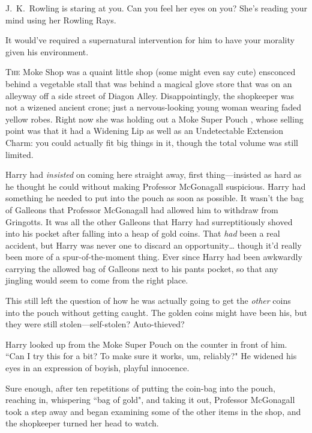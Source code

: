 
\begin{chapterOpeningAuthorNote}
J.~K.~Rowling is staring at you. Can you feel her eyes on you? She's reading your mind using her Rowling Rays.
\end{chapterOpeningAuthorNote}
\begin{chapterOpeningQuote}
It would've required a supernatural intervention for him to have your morality given his environment.
\end{chapterOpeningQuote}

\lettrine{T}{he} Moke Shop was a quaint little shop (some might even say cute) ensconced behind a vegetable stall that was behind a magical glove store that was on an alleyway off a side street of Diagon Alley. Disappointingly, the shopkeeper was not a wizened ancient crone; just a nervous-looking young woman wearing faded yellow robes. Right now she was holding out a Moke Super Pouch , whose selling point was that it had a Widening Lip as well as an Undetectable Extension Charm: you could actually fit big things in it, though the total volume was still limited.

Harry had \emph{insisted} on coming here straight away, first thing---insisted as hard as he thought he could without making Professor McGonagall suspicious. Harry had something he needed to put into the pouch as soon as possible. It wasn't the bag of Galleons that Professor McGonagall had allowed him to withdraw from Gringotts. It was all the other Galleons that Harry had surreptitiously shoved into his pocket after falling into a heap of gold coins. That \emph{had} been a real accident, but Harry was never one to discard an opportunity{\ldots} though it'd really been more of a spur-of-the-moment thing. Ever since Harry had been awkwardly carrying the allowed bag of Galleons next to his pants pocket, so that any jingling would seem to come from the right place.

This still left the question of how he was actually going to get the \emph{other} coins into the pouch without getting caught. The golden coins might have been his, but they were still stolen---self-stolen? Auto-thieved?

Harry looked up from the Moke Super Pouch  on the counter in front of him. ``Can I try this for a bit? To make sure it works, um, reliably?" He widened his eyes in an expression of boyish, playful innocence.

Sure enough, after ten repetitions of putting the coin-bag into the pouch, reaching in, whispering ``bag of gold", and taking it out, Professor McGonagall took a step away and began examining some of the other items in the shop, and the shopkeeper turned her head to watch.

